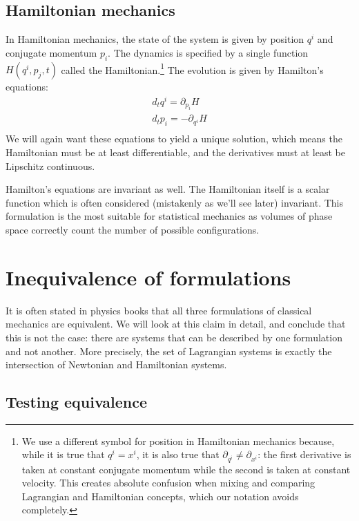 \subsection{Hamiltonian mechanics}

In Hamiltonian mechanics, the state of the system is given by position $q^i$ and conjugate momentum $p_i$. The dynamics is specified by a single function $H(q^i, p_j, t)$ called the Hamiltonian.\footnote{We use a different symbol for position in Hamiltonian mechanics because, while it is true that $q^i = x^i$, it is also true that $\partial_{q^i} \neq \partial_{x^i}$: the first derivative is taken at constant conjugate momentum while the second is taken at constant velocity. This creates absolute confusion when mixing and comparing Lagrangian and Hamiltonian concepts, which our notation avoids completely.} The evolution is given by Hamilton's equations:
\begin{equation}\label{rp-cm-HamiltonEq}
	\begin{aligned}
		d_t q^i = \partial_{p_i} H \\
		d_t p_i = - \partial_{q^i} H \\
	\end{aligned}
\end{equation}
We will again want these equations to yield a unique solution, which means the Hamiltonian must be at least differentiable, and the derivatives must at least be Lipschitz continuous.

Hamilton's equations are invariant as well. The Hamiltonian itself is a scalar function which is often considered (mistakenly as we'll see later) invariant. This formulation is the most suitable for statistical mechanics as volumes of phase space correctly count the number of possible configurations.

\section{Inequivalence of formulations}\label{rp-cm-inequivalenceOfFormulations}

It is often stated in physics books that all three formulations of classical mechanics are equivalent. We will look at this claim in detail, and conclude that this is not the case: there are systems that can be described by one formulation and not another. More precisely, the set of Lagrangian systems is exactly the intersection of Newtonian and Hamiltonian systems.

\subsection{Testing equivalence}

